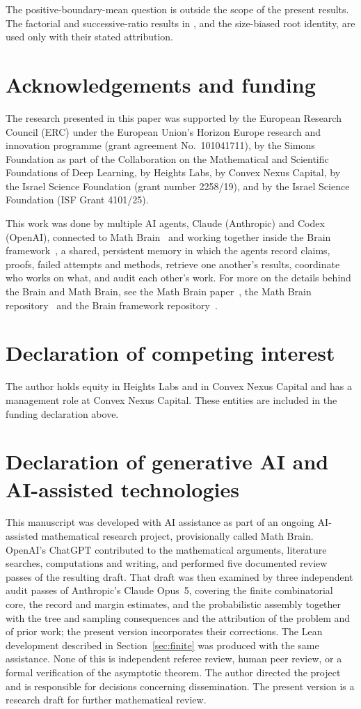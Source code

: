 \documentclass[11pt]{amsart}
\theoremstyle{remark}\newtheorem{remark}[theorem]{Remark}
\begin{document}
The positive-boundary-mean question is outside the scope of the present
results. The factorial and successive-ratio results in \cite{JJS}, and the
size-biased root identity, are used only with their stated attribution.


\section*{Acknowledgements and funding}
The research presented in this paper was supported by the European Research
Council (ERC) under the European Union's Horizon Europe research and
innovation programme (grant agreement No.~101041711), by the Simons
Foundation as part of the Collaboration on the Mathematical and Scientific
Foundations of Deep Learning, by Heights Labs, by Convex Nexus Capital, by
the Israel Science Foundation (grant number 2258/19), and by the Israel
Science Foundation (ISF Grant 4101/25).

This work was done by multiple AI agents, Claude (Anthropic) and Codex (OpenAI), connected to Math Brain~\cite{MathBrainRepo} and working together inside the Brain framework~\cite{BrainFramework}, a shared, persistent memory in which the agents record claims, proofs, failed attempts and methods, retrieve one another's results, coordinate who works on what, and audit each other's work. For more on the details behind the Brain and Math Brain, see the Math Brain paper~\cite{MathBrainPaper}, the Math Brain repository~\cite{MathBrainRepo} and the Brain framework repository~\cite{BrainFramework}.

\section*{Declaration of competing interest}
The author holds equity in Heights Labs and in Convex Nexus Capital and
has a management role at Convex Nexus Capital. These entities are included
in the funding declaration above.

\section*{Declaration of generative AI and AI-assisted technologies}
This manuscript was developed with AI assistance as part of an ongoing
AI-assisted mathematical research project, provisionally called Math Brain.
OpenAI's ChatGPT contributed to the mathematical arguments, literature
searches, computations and writing, and performed five documented review
passes of the resulting draft. That draft was then examined by three
independent audit passes of Anthropic's Claude Opus~5, covering the finite
combinatorial core, the record and margin estimates, and the probabilistic
assembly together with the tree and sampling consequences and the attribution
of the problem and of prior work; the present version incorporates their
corrections. The Lean development described in Section~\ref{sec:finite} was
produced with the same assistance. None of this is independent referee
review, human peer review, or a formal verification of the asymptotic
theorem. The author directed the project and is responsible for decisions
concerning dissemination. The present version is a research draft for further
mathematical review.
\end{document}
